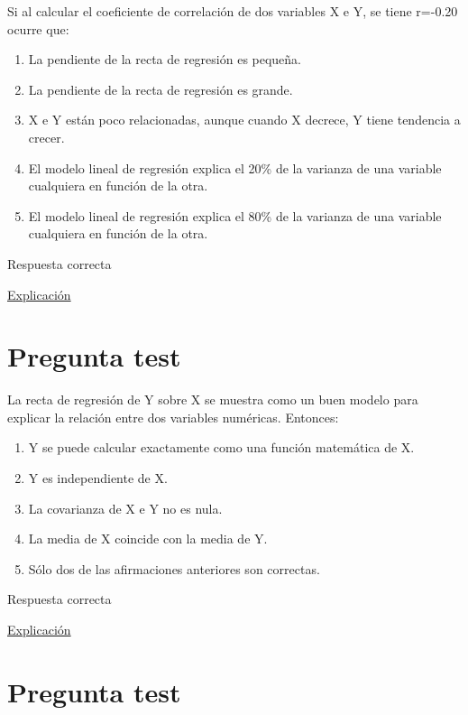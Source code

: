 \documentclass[
]{book}
\providecommand{\tightlist}{%
  \setlength{\itemsep}{0pt}\setlength{\parskip}{0pt}}
\begin{document}
Si al calcular el coeficiente de correlación de dos variables X e Y, se tiene r=-0.20 ocurre que:

\begin{enumerate}
\def\labelenumi{\alph{enumi})}
\tightlist
\item
  La pendiente de la recta de regresión es pequeña.
\item
  La pendiente de la recta de regresión es grande.
\item
  X e Y están poco relacionadas, aunque cuando X decrece, Y tiene tendencia a crecer.
\item
  El modelo lineal de regresión explica el 20\% de la varianza de una variable cualquiera en función de la otra.
\item
  El modelo lineal de regresión explica el 80\% de la varianza de una variable cualquiera en función de la otra.
\end{enumerate}

Respuesta correcta

\href{https://1fjmanzano.github.io/bioestadistica/relaci\%C3\%B3n-entre-variables-nume\%CC\%81ricas.html}{Explicación}

\hypertarget{pregunta-test-123}{%
\section{Pregunta test}\label{pregunta-test-123}}

La recta de regresión de Y sobre X se muestra como un buen modelo para explicar la relación entre dos variables numéricas. Entonces:

\begin{enumerate}
\def\labelenumi{\alph{enumi})}
\tightlist
\item
  Y se puede calcular exactamente como una función matemática de X.
\item
  Y es independiente de X.
\item
  La covarianza de X e Y no es nula.
\item
  La media de X coincide con la media de Y.
\item
  Sólo dos de las afirmaciones anteriores son correctas.
\end{enumerate}

Respuesta correcta

\href{https://1fjmanzano.github.io/bioestadistica/relaci\%C3\%B3n-entre-variables-nume\%CC\%81ricas.html\#covarianza}{Explicación}

\hypertarget{pregunta-test-124}{%
\section{Pregunta test}\label{pregunta-test-124}}
\end{document}
